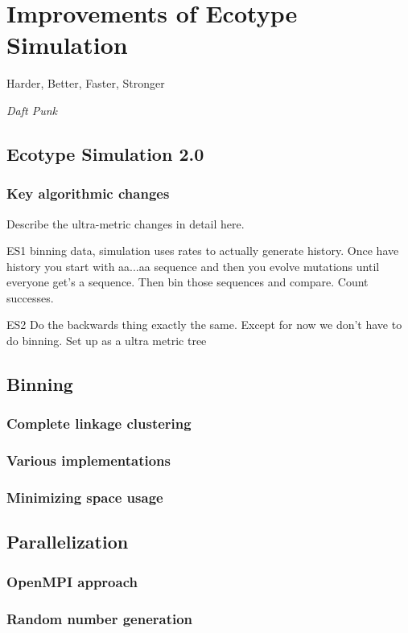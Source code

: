 \chapter{Improvements of Ecotype Simulation}

\begin{shadequote}
Harder, Better, Faster, Stronger \par\emph{Daft Punk}
\end{shadequote}


\section{Ecotype Simulation 2.0}
\subsection{Key algorithmic changes}
Describe the ultra-metric changes in detail here.

ES1 binning data, simulation uses rates to actually generate history. Once have history you start with aa...aa sequence and then you evolve mutations until everyone get's a sequence. Then bin those sequences and compare. Count successes.


ES2 Do the backwards thing exactly the same. Except for now we don't have to do binning. Set up as a ultra metric tree


\section{Binning}
\subsection{Complete linkage clustering}
\subsection{Various implementations}
\subsection{Minimizing space usage}
\section{Parallelization}
\subsection{OpenMPI approach}
\subsection{Random number generation}